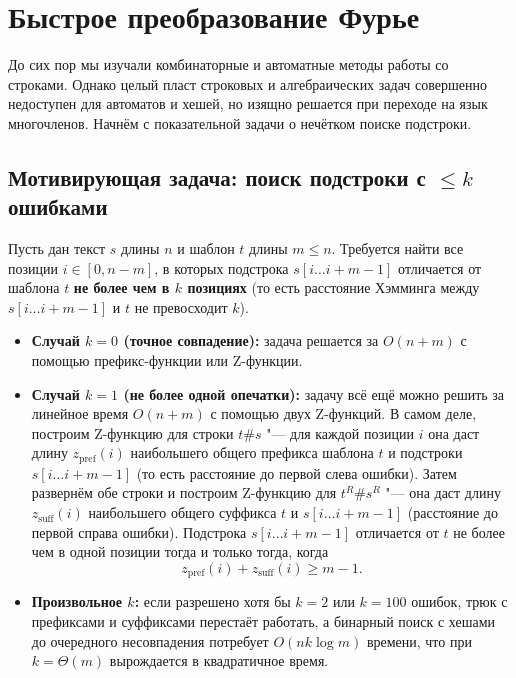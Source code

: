 \section{Быстрое преобразование Фурье}

До сих пор мы изучали комбинаторные и автоматные методы работы со строками. Однако целый пласт строковых и алгебраических задач совершенно недоступен для автоматов и хешей, но изящно решается при переходе на язык многочленов. Начнём с показательной задачи о нечётком поиске подстроки.

\subsection{Мотивирующая задача: поиск подстроки с \texorpdfstring{$\le k$}{<= k} ошибками}

Пусть дан текст $s$ длины $n$ и шаблон $t$ длины $m \le n$. Требуется найти все позиции $i \in [0, n - m]$, в которых подстрока $s[i \dots i + m - 1]$ отличается от шаблона $t$ \textbf{не более чем в $k$ позициях} (то есть расстояние Хэмминга между $s[i \dots i + m - 1]$ и $t$ не превосходит $k$).

\begin{itemize}
    \item \textbf{Случай $k = 0$ (точное совпадение):} задача решается за $O(n + m)$ с помощью префикс-функции или Z-функции.
    \item \textbf{Случай $k = 1$ (не более одной опечатки):} задачу всё ещё можно решить за линейное время $O(n + m)$ с помощью двух Z-функций. В самом деле, построим Z-функцию для строки $t\mathtt{\#}s$ "--- для каждой позиции $i$ она даст длину $z_{\text{pref}}(i)$ наибольшего общего префикса шаблона $t$ и подстроки $s[i \dots i + m - 1]$ (то есть расстояние до первой слева ошибки). Затем развернём обе строки и построим Z-функцию для $t^R\mathtt{\#}s^R$ "--- она даст длину $z_{\text{suff}}(i)$ наибольшего общего суффикса $t$ и $s[i \dots i + m - 1]$ (расстояние до первой справа ошибки). Подстрока $s[i \dots i + m - 1]$ отличается от $t$ не более чем в одной позиции тогда и только тогда, когда
    \[
        z_{\text{pref}}(i) + z_{\text{suff}}(i) \ge m - 1.
    \]
    \item \textbf{Произвольное $k$:} если разрешено хотя бы $k = 2$ или $k = 100$ ошибок, трюк с префиксами и суффиксами перестаёт работать, а бинарный поиск с хешами до очередного несовпадения потребует $O(n k \log m)$ времени, что при $k = \Theta(m)$ вырождается в квадратичное время.
\end{itemize}

